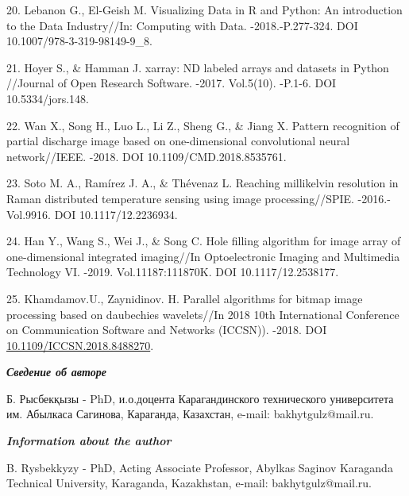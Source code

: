 \begin{refs}
20. Lebanon G., El-Geish M. Visualizing Data in R and Python: An
introduction to the Data Industry//In: Computing with Data.
-2018.-P.277-324. DOI 10.1007/978-3-319-98149-9\_8.

21. Hoyer S., \& Hamman J. xarray: ND labeled arrays and datasets in
Python //Journal of Open Research Software. -2017. Vol.5(10). -P.1-6.
DOI 10.5334/jors.148.

22. Wan X., Song H., Luo L., Li Z., Sheng G., \& Jiang X. Pattern
recognition of partial discharge image based on one-dimensional
convolutional neural network//IEEE. -2018. DOI 10.1109/CMD.2018.8535761.

23. Soto M. A., Ramírez J. A., \& Thévenaz L. Reaching millikelvin
resolution in Raman distributed temperature sensing using image
processing//SPIE. -2016.-Vol.9916. DOI 10.1117/12.2236934.

24. Han Y., Wang S., Wei J., \& Song C. Hole filling algorithm for image
array of one-dimensional integrated imaging//In Optoelectronic Imaging
and Multimedia Technology VI. -2019. Vol.11187:111870K. DOI
10.1117/12.2538177.

25. Khamdamov.U., Zaynidinov. H. Parallel algorithms for bitmap image
processing based on daubechies wavelets//In 2018 10th International
Conference on Communication Software and Networks (ICCSN)). -2018. DOI
\href{https://doi.org/10.1109/ICCSN.2018.8488270}{10.1109/ICCSN.2018.8488270}.
\end{refs}

\begin{info}
\hspace{1em}\emph{{\bfseries Сведение об авторе}}

Б. Рысбекқызы - PhD, и.о.доцента Карагандинского технического
университета им. Абылкаса Сагинова, Караганда, Казахстан, e-mail:
bakhytgulz@mail.ru.

\hspace{1em}\emph{{\bfseries Information about the author}}

B. Rysbekkyzy - PhD, Acting Associate Professor, Abylkas Saginov
Karaganda Technical University, Karaganda, Kazakhstan, e-mail:
bakhytgulz@mail.ru.
\end{info}
